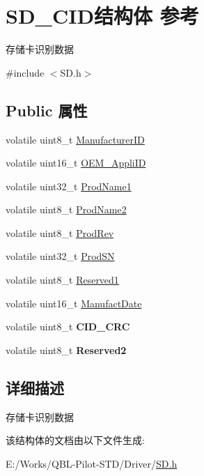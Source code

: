 \hypertarget{struct_s_d___c_i_d}{}\section{S\+D\+\_\+\+C\+I\+D结构体 参考}
\label{struct_s_d___c_i_d}


存储卡识别数据  




{\ttfamily \#include $<$S\+D.\+h$>$}

\subsection*{Public 属性}
\begin{DoxyCompactItemize}
\item 
volatile uint8\+\_\+t \hyperlink{group__sd__card_gac16d38fcef6d661738d8f880f899a5ee}{Manufacturer\+ID}
\item 
volatile uint16\+\_\+t \hyperlink{group__sd__card_gae715248acd4c86ce3b821759bef6f1e1}{O\+E\+M\+\_\+\+Appli\+ID}
\item 
volatile uint32\+\_\+t \hyperlink{group__sd__card_gab707dc163bd2cb8fc8d98643ea797585}{Prod\+Name1}
\item 
volatile uint8\+\_\+t \hyperlink{group__sd__card_gaaa6e8c0191c67b8692c0dc8dfccff76d}{Prod\+Name2}
\item 
volatile uint8\+\_\+t \hyperlink{group__sd__card_ga3c9906d1956b15f7e333323af56fe052}{Prod\+Rev}
\item 
volatile uint32\+\_\+t \hyperlink{group__sd__card_gadc2afe7dd7073a844eaebb4bd4449abb}{Prod\+SN}
\item 
volatile uint8\+\_\+t \hyperlink{group__sd__card_ga1d5599017d56204e4fe5b0aa7dd32294}{Reserved1}
\item 
volatile uint16\+\_\+t \hyperlink{group__sd__card_ga6fa8e16f55984066e24cf2503477dfcd}{Manufact\+Date}
\item 
volatile uint8\+\_\+t {\bfseries C\+I\+D\+\_\+\+C\+RC}
\item 
volatile uint8\+\_\+t {\bfseries Reserved2}
\end{DoxyCompactItemize}


\subsection{详细描述}
存储卡识别数据 

该结构体的文档由以下文件生成\+:\begin{DoxyCompactItemize}
\item 
E\+:/\+Works/\+Q\+B\+L-\/\+Pilot-\/\+S\+T\+D/\+Driver/\hyperlink{_s_d_8h}{S\+D.\+h}\end{DoxyCompactItemize}
